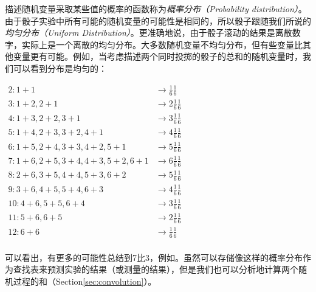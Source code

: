 描述随机变量采取某些值的概率的函数称为\emph{概率分布（Probability distribution）}。
由于骰子实验中所有可能的随机变量的可能性是相同的，所以骰子跟随我们所说的\emph{均匀分布（Uniform Distribution）}。更准确地说，由于骰子滚动的结果是离散数字，实际上是一个离散的均匀分布。大多数随机变量不均匀分布，但有些变量比其他变量更有可能。例如，当考虑描述两个同时投掷的骰子的总和的随机变量时，我们可以看到分布是均匀的：

$\begin{array}{ll}
2: 1+1 & \rightarrow \frac{1}{6}\frac{1}{6}\\
3: 1+2, 2+1 &\rightarrow 2\frac{1}{6}\frac{1}{6}\\
4: 1+3, 2+2, 3+1 &\rightarrow 3\frac{1}{6}\frac{1}{6}\\
5: 1+4, 2+3, 3+2, 4+1 & \rightarrow 4\frac{1}{6}\frac{1}{6}\\
6: 1+5, 2+4, 3+3, 4+2, 5+1 & \rightarrow 5\frac{1}{6}\frac{1}{6}\\
7: 1+6, 2+5, 3+4, 4+3, 5+2, 6+1 & \rightarrow 6\frac{1}{6}\frac{1}{6}\\
8: 2+6, 3+5, 4+4, 5+3, 6+2 & \rightarrow 5\frac{1}{6}\frac{1}{6}\\
9: 3+6, 4+5, 5+4, 6+3 & \rightarrow 4\frac{1}{6}\frac{1}{6}\\
10: 4+6, 5+5, 6+4 & \rightarrow 3\frac{1}{6}\frac{1}{6}\\
11: 5+6, 6+5 & \rightarrow 2\frac{1}{6}\frac{1}{6}\\
12: 6+6 & \rightarrow \frac{1}{6}\frac{1}{6}\\
\end{array}$


可以看出，有更多的可能性总结到7比3，例如。虽然可以存储像这样的概率分布作为查找表来预测实验的结果（或测量的结果），但是我们也可以分析地计算两个随机过程的和（Section\ref{sec:convolution}）。


